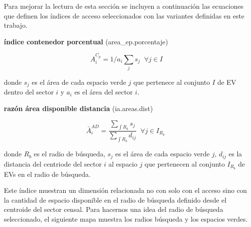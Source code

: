\documentclass[12pt,]{book}
\begin{document}
Para mejorar la lectura de esta sección se incluyen a continuación las
ecuaciones que definen los índices de acceso seleccionados con las
variantes definidas en este trabajo.

\textbf{índice contenedor porcentual} (area\_ep.porcentaje)

\begin{equation}
A^{C_p}_i =1/a_i\sum_j{s_j} \;  \; \forall  j \in I
\label{eq:n-cont}
\end{equation}

donde \(s_j\) es el área de cada espacio verde \(j\) que pertenece al
conjunto \(I\) de EV dentro del sector \(i\) y \(a_i\) es el área del
sector \(i\).

\textbf{razón área disponible distancia} (ia.areas.dist)

\begin{equation}
\bar{A}^{AD}_i= \frac{\sum_{\int R_b }{s_j}}{\sum_{\int R_b }{d_{ij}}}  \;  \; \forall  j \in I_{R_b} \; 
\label{eq:areas-dists}
\end{equation}

donde \(R_b\) es el radio de búsqueda, \(s_j\) es el área de cada
espacio verde \(j\), \(d_{ij}\) es la distancia del centriode del sector
\(i\) al espacio \(j\) que pertenecen al conjunto \(I_{R_b}\) de EVs en
el radio de búsqueda.

Este índice muestran un dimensión relacionada no con solo con el acceso
sino con la cantidad de espacio disponible en el radio de búsqueda
definido desde el centroide del sector censal. Para hacernos una idea
del radio de búsqueda seleccionado, el siguiente mapa muestra los radios
búsqueda y los espacios verdes.
\end{document}
